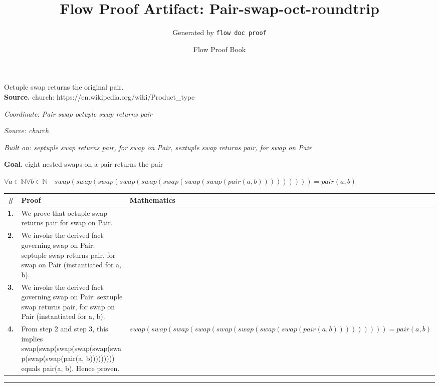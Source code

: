 \documentclass[11pt]{article}
\title{Flow Proof Artifact: Pair-swap-oct-roundtrip}
\author{Generated by \texttt{flow doc proof}}
\date{Flow Proof Book}
\theoremstyle{definition}
\begin{document}
\maketitle
Octuple swap returns the original pair.\\[0.5em]
\textbf{Source.} church: https://en.wikipedia.org/wiki/Product\_type\\[0.5em]
\bigskip
{}\par
\smallskip\noindent\textit{Coordinate: Pair \cdot swap \cdot octuple swap returns pair}\par
\smallskip\noindent\textit{Source: church}\par
\smallskip\noindent\textit{Built on: septuple swap returns pair, for swap on Pair, sextuple swap returns pair, for swap on Pair}\par
\medskip
\noindent\textbf{Goal.} eight nested swaps on a pair returns the pair\par
\noindent$\displaystyle \forall a \in \mathbb{N} \forall b \in \mathbb{N}\quad swap(swap(swap(swap(swap(swap(swap(swap(pair(a, b))))))))) = pair(a, b)$\par
\medskip
\noindent
\begin{tabular}{@{} >{\raggedright\arraybackslash}p{} >{\raggedright\arraybackslash}p{} >{\raggedleft\arraybackslash}p{} @{}}
\textbf{\#} & \textbf{Proof} & \textbf{Mathematics} \\
\midrule
\textbf{1.} & We prove that octuple swap returns pair for swap on Pair. & \\[0.45em]
\textbf{2.} & We invoke the derived fact governing swap on Pair: septuple swap returns pair, for swap on Pair (instantiated for a, b). & \\[0.45em]
\textbf{3.} & We invoke the derived fact governing swap on Pair: sextuple swap returns pair, for swap on Pair (instantiated for a, b). & \\[0.45em]
\textbf{4.} & From step 2 and step 3, this implies swap(swap(swap(swap(swap(swap(swap(swap(pair(a, b))))))))) equals pair(a, b). Hence proven. & $\displaystyle swap(swap(swap(swap(swap(swap(swap(swap(pair(a, b))))))))) = pair(a, b)$ \\[0.45em]
\bottomrule
\end{tabular}
\label{thm:Pair-swap-octuple_swap_returns_pair}
\par\medskip\hrule
\end{document}
